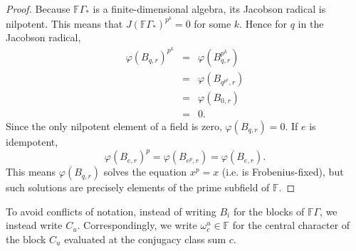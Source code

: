 \documentclass[ALCO,Unicode]{cedram}
\begin{document}
\begin{proof}
Because $\mathbb{F}\Gamma_*$ is a finite-dimensional algebra, its Jacobson radical is nilpotent. This means that $J(\mathbb{F}\Gamma_*)^{p^k} = 0$ for some $k$. Hence for $q$ in the Jacobson radical,
\begin{eqnarray*}
\varphi(B_{q,r})^{p^k} 
&=& \varphi(B_{q,r}^{p^k}) \\ 
&=& \varphi(B_{q^{p^k},r}) \\ 
&=& \varphi(B_{0,r}) \\
&=& 0.
\end{eqnarray*}
Since the only nilpotent element of a field is zero, $\varphi(B_{q,r}) = 0$. If $e$ is idempotent,
\[
\varphi(B_{e,r})^p = \varphi(B_{e^p,r}) = \varphi(B_{e,r}).
\]
This means $\varphi(B_{q,r})$ solves the equation $x^p = x$ (i.e. is Frobenius-fixed), but such solutions are precisely elements of the prime subfield of $\mathbb{F}$.
\end{proof}

To avoid conflicts of notation, instead of writing $B_i$ for the blocks of $\mathbb{F}\Gamma$, we instead write $C_u$. Correspondingly, we write $\omega_c^{u} \in \mathbb{F}$ for the central character of the block $C_u$ evaluated at the conjugacy class sum $c$.
\end{document}
